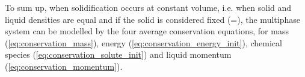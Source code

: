 To sum up, when solidification occurs at constant volume, i.e. when solid and liquid densities are equal and if the solid is considered fixed (\vs =),
the multiphase system can be modelled by the four average conservation equations, for mass (\cref{eq:conservation_mass}), energy (\cref{eq:conservation_energy_init}), 
chemical species (\cref{eq:conservation_solute_init}) and liquid momentum (\cref{eq:conservation_momentum}).


